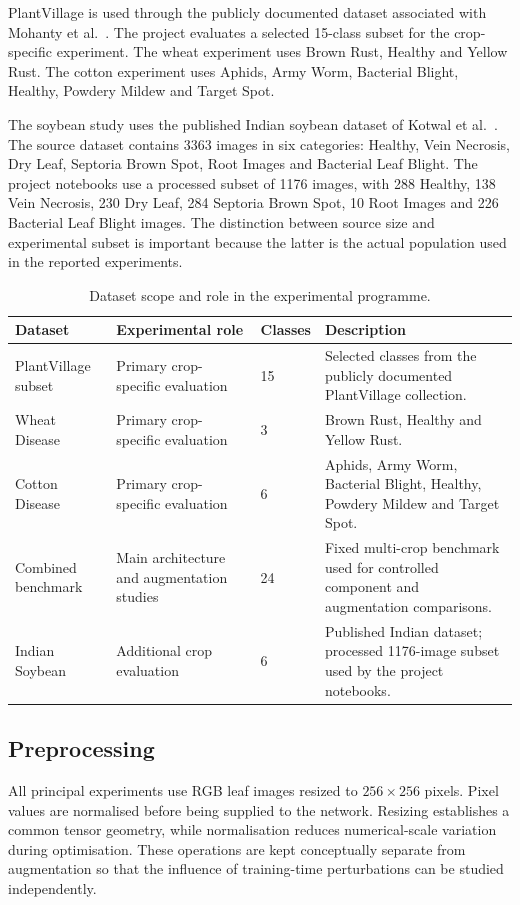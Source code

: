 \documentclass[a4paper,fleqn]{cas-dc}
\begin{document}
PlantVillage is used through the publicly documented dataset associated with Mohanty et al.~\citep{mohanty2016}. The project evaluates a selected 15-class subset for the crop-specific experiment. The wheat experiment uses Brown Rust, Healthy and Yellow Rust. The cotton experiment uses Aphids, Army Worm, Bacterial Blight, Healthy, Powdery Mildew and Target Spot.

The soybean study uses the published Indian soybean dataset of Kotwal et al.~\citep{kotwal2024}. The source dataset contains 3363 images in six categories: Healthy, Vein Necrosis, Dry Leaf, Septoria Brown Spot, Root Images and Bacterial Leaf Blight. The project notebooks use a processed subset of 1176 images, with 288 Healthy, 138 Vein Necrosis, 230 Dry Leaf, 284 Septoria Brown Spot, 10 Root Images and 226 Bacterial Leaf Blight images. The distinction between source size and experimental subset is important because the latter is the actual population used in the reported experiments.

\begin{table}[!t]
\centering
\caption{Dataset scope and role in the experimental programme.}
\label{tab:datasets}
\small
\begin{tabular}{p{3.0cm}p{3.0cm}p{1.3cm}p{7.1cm}}
\toprule
Dataset & Experimental role & Classes & Description \\
\midrule
PlantVillage subset & Primary crop-specific evaluation & 15 & Selected classes from the publicly documented PlantVillage collection. \\
Wheat Disease & Primary crop-specific evaluation & 3 & Brown Rust, Healthy and Yellow Rust. \\
Cotton Disease & Primary crop-specific evaluation & 6 & Aphids, Army Worm, Bacterial Blight, Healthy, Powdery Mildew and Target Spot. \\
Combined benchmark & Main architecture and augmentation studies & 24 & Fixed multi-crop benchmark used for controlled component and augmentation comparisons. \\
Indian Soybean & Additional crop evaluation & 6 & Published Indian dataset; processed 1176-image subset used by the project notebooks. \\
\bottomrule
\end{tabular}
\end{table}

\subsection{Preprocessing}
All principal experiments use RGB leaf images resized to $256\times256$ pixels. Pixel values are normalised before being supplied to the network. Resizing establishes a common tensor geometry, while normalisation reduces numerical-scale variation during optimisation. These operations are kept conceptually separate from augmentation so that the influence of training-time perturbations can be studied independently.
\end{document}
